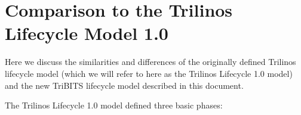 \documentclass[11pt]{SANDreport}
\begin{document}
%
\clearpage




\appendix

%
\section{Comparison to the Trilinos Lifecycle Model 1.0}
\label{sec:compare_with_lifecycle_1.0_model}
%

Here we discuss the similarities and differences of the originally
defined Trilinos lifecycle model {}\cite{TrilinosLifecycleModel2007}
(which we will refer to here as the Trilinos Lifecycle 1.0 model) and the
new TriBITS lifecycle model described in this document.

The Trilinos Lifecycle 1.0 model defined three basic phases:
\end{document}
